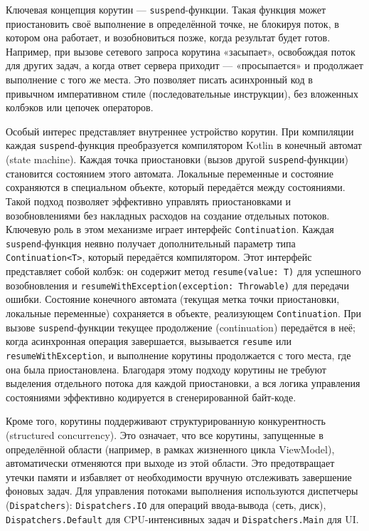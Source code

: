 Ключевая концепция корутин — \texttt{suspend}-функции. Такая функция может приостановить своё выполнение в определённой точке, не блокируя поток, в котором она работает, и возобновиться позже, когда результат будет готов. Например, при вызове сетевого запроса корутина «засыпает», освобождая поток для других задач, а когда ответ сервера приходит — «просыпается» и продолжает выполнение с того же места. Это позволяет писать асинхронный код в привычном императивном стиле (последовательные инструкции), без вложенных колбэков или цепочек операторов.

Особый интерес представляет внутреннее устройство корутин. При компиляции каждая \texttt{suspend}-функция преобразуется компилятором Kotlin в конечный автомат (state machine). Каждая точка приостановки (вызов другой \texttt{suspend}-функции) становится состоянием этого автомата. Локальные переменные и состояние сохраняются в специальном объекте, который передаётся между состояниями. Такой подход позволяет эффективно управлять приостановками и возобновлениями без накладных расходов на создание отдельных потоков.
Ключевую роль в этом механизме играет интерфейс \texttt{Continuation}. Каждая \texttt{suspend}-функция неявно получает дополнительный параметр типа \texttt{Continuation<T>}, который передаётся компилятором. Этот интерфейс представляет собой колбэк: он содержит метод \texttt{resume(value: T)} для успешного возобновления и \texttt{resumeWithException(exception: Throwable)} для передачи ошибки. Состояние конечного автомата (текущая метка точки приостановки, локальные переменные) сохраняется в объекте, реализующем \texttt{Continuation}. При вызове \texttt{suspend}-функции текущее продолжение (continuation) передаётся в неё; когда асинхронная операция завершается, вызывается \texttt{resume} или \texttt{resumeWithException}, и выполнение корутины продолжается с того места, где она была приостановлена. Благодаря этому подходу корутины не требуют выделения отдельного потока для каждой приостановки, а вся логика управления состояниями эффективно кодируется в сгенерированной байт-коде.


Кроме того, корутины поддерживают структурированную конкурентность (structured concurrency). Это означает, что все корутины, запущенные в определённой области (например, в рамках жизненного цикла ViewModel), автоматически отменяются при выходе из этой области. Это предотвращает утечки памяти и избавляет от необходимости вручную отслеживать завершение фоновых задач. Для управления потоками выполнения используются диспетчеры (\texttt{Dispatchers}): \texttt{Dispatchers.IO} для операций ввода-вывода (сеть, диск), \texttt{Dispatchers.Default} для CPU-интенсивных задач и \texttt{Dispatchers.Main} для UI.

